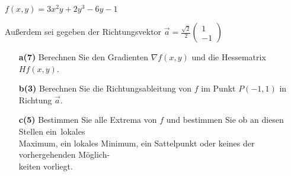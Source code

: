 \documentclass[a4paper, ngerman, 11pt]{article}
\begin{document}
	\smallskip
	\noindent
	$f(x,y) = 3x^2y + 2y^3 - 6y - 1$
	
	\noindent
	Außerdem sei gegeben der Richtungsvektor $\vec{a} = \frac{\sqrt{2}}{2} \begin{pmatrix} 1 \\ -1 \end{pmatrix}$
	
	\begin{enumerate}
		\item[\textbf{a(7)}] Berechnen Sie den Gradienten $\nabla f(x,y)$ und die Hessematrix $Hf(x,y)$.
		\item[\textbf{b(3)}] Berechnen Sie die Richtungsableitung von $f$ im Punkt $P(-1,1)$ in Richtung $\vec{a}$.
		\item[\textbf{c(5)}] \noindent
		 \quad Bestimmen Sie alle Extrema von $f$ und bestimmen Sie ob an diesen Stellen ein~lokales \\
		\qquad Maximum, ein lokales Minimum, ein Sattelpunkt oder keines der vorhergehenden Möglich-\\ 
		\qquad keiten vorliegt.
	\end{enumerate}
\end{document}
